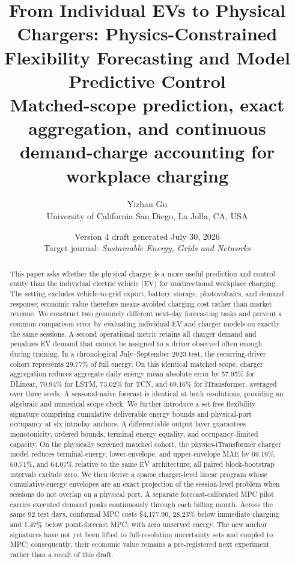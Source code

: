 \documentclass[11pt]{article}
\title{\textbf{From Individual EVs to Physical Chargers:
Physics-Constrained Flexibility Forecasting and Model Predictive Control}\\
\large Matched-scope prediction, exact aggregation, and continuous
demand-charge accounting for workplace charging}
\author{Yizhan Gu\\
University of California San Diego, La Jolla, CA, USA}
\date{Version 4 draft generated July 30, 2026\\
\small Target journal: \emph{Sustainable Energy, Grids and Networks}}
\begin{document}
\maketitle

\begin{abstract}
This paper asks whether the physical charger is a more useful prediction and
control entity than the individual electric vehicle (EV) for unidirectional
workplace charging.  The setting excludes vehicle-to-grid export, battery
storage, photovoltaics, and demand response; economic value therefore means
avoided charging cost rather than market revenue.  We construct two genuinely
different next-day forecasting tasks and prevent a common comparison error by
evaluating individual-EV and charger models on exactly the same sessions.  A
second operational metric retains all charger demand and penalizes EV demand
that cannot be assigned to a driver observed often enough during training.  In
a chronological July--September 2023 test, the recurring-driver cohort
represents 29.77\% of full energy.  On this identical matched scope, charger
aggregation reduces aggregate daily energy mean absolute error by 57.95\% for
DLinear, 70.94\% for LSTM, 73.02\% for TCN, and 69.16\% for iTransformer,
averaged over three seeds.  A seasonal-naive forecast is identical at both
resolutions, providing an algebraic and numerical scope check.  We further
introduce a set-free flexibility signature comprising cumulative deliverable
energy bounds and physical-port occupancy at six intraday anchors.  A
differentiable output layer guarantees monotonicity, ordered bounds, terminal
energy equality, and occupancy-limited capacity.  On the physically screened
matched cohort, the physics-iTransformer charger model reduces terminal-energy,
lower-envelope, and upper-envelope MAE by 69.19\%, 60.71\%, and 64.07\%
relative to the same EV architecture; all paired block-bootstrap intervals
exclude zero.  We then derive a sparse charger-level linear program whose
cumulative-energy envelopes are an exact projection of the session-level
problem when sessions do not overlap on a physical port.  A separate
forecast-calibrated MPC pilot carries executed demand peaks continuously
through each billing month.  Across the same 92 test days, conformal MPC costs
\$4,177.90, 28.23\% below immediate charging and 1.47\% below point-forecast
MPC, with zero unserved energy.  The new anchor signatures have not yet been
lifted to full-resolution uncertainty sets and coupled to MPC; consequently,
their economic value remains a pre-registered next experiment rather than a
result of this draft.
\end{abstract}
\end{document}
